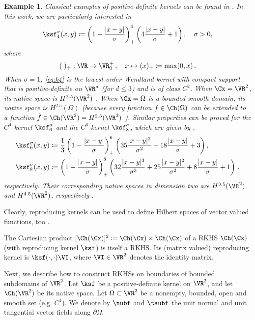 \documentclass{siamart1116}
\newtheorem{example}[theorem]{Example}
\numberwithin{theorem}{section}
\begin{document}
\begin{example}\label{ex:kernel} Classical examples of positive-definite kernels
can be found in \cite{Wendlandbook}. In this work, we are particularly interested in
\begin{equation}\label{eq:k4}
\ksf^\sigma_4(x,y)\coloneqq \left(1-\frac{|x-y|}{\sigma}\right)_+^4\left(4\frac{|x-y|}{\sigma} +1\right), \quad \sigma>0,
\end{equation}
where
\begin{equation*}(\cdot)_+:\VR\to\VR^+_0\,,\quad x\mapsto (x)_+\coloneqq\max(0, x)\,.\end{equation*}
When $\sigma=1$,  \cref{eq:k4} is the lowest order Wendland
kernel with compact support that is
positive-definite on $\VR^d$ (for $d\le 3$) and is of class $C^2$.
When $\Cx=\VR^2$, its native space
is $H^{2.5}(\VR^2)$ \cite[p. 160, Thm. 10.35]{Wendlandbook}. 
When $\Cx=\Omega$ is a bounded smooth domain, its native space is $H^{2.5}(\Omega)$
(because every function $f\in\Ch(\Omega)$ can be extended to a function
$\tilde f\in\Ch(\VR^2) = H^{2.5}(\VR^2)$ \cite[p. 169, Thm. 10.46]{Wendlandbook}).
Similar properties can be proved for the $C^4$-kernel $\ksf^\sigma_6$ and the $C^6$-kernel $\ksf^\sigma_8$,
which are given by \cite{Wendlandbook},
\begin{align}
\label{eq:k6}
\ksf^\sigma_6(x,y)&\coloneqq 
\frac{1}{3}\left(1-\frac{|x-y|}{\sigma}\right)_+^6\left(35\frac{|x-y|^2}{\sigma^2}+18\frac{|x-y|}{\sigma} +3\right), \\
\label{eq:k8}
\ksf^\sigma_8(x,y)&\coloneqq \left(1-\frac{|x-y|}{\sigma}\right)_+^8\left(32\frac{|x-y|^3}{\sigma^3}+25\frac{|x-y|^2}{\sigma^2}
+8\frac{|x-y|}{\sigma} +1\right)\,,
\end{align}
respectively. Their corresponding native spaces in dimension two are $H^{3.5}(\VR^2)$ and 
$H^{4.5}(\VR^2)$, respectively \cite[p. 160, Thm. 10.35]{Wendlandbook}.
\end{example}

Clearly, reproducing kernels can be used to define Hilbert spaces of vector valued functions, too
\cite{Wendlandbook}.
\begin{proposition}
The Cartesian product $[\Ch(\Cx)]^2\coloneqq \Ch(\Cx)\times\Ch(\Cx)$ of a RKHS
$\Ch(\Cx)$ (with reproducing kernel $\ksf$) is itself a RKHS. Its (matrix valued) reproducing kernel is $\ksf(\cdot,\cdot) \VI$, where $\VI\in\VR^2$ denotes the identity matrix.
\end{proposition}

Next, we describe how to construct RKHSs on boundaries of bounded subdomains of $\VR^2$.
Let $\ksf$ be a positive-definite kernel on $\VR^2$, and let $\Ch(\VR^2)$ be 
its native space. Let $\Omega\subset \VR^2$ be a nonempty,
bounded, open and smooth set (e.g. $C^1$). 
We denote by $\nubf$ and $\taubf$ the unit normal and unit tangential vector fields along $\partial \Omega$. 
\end{document}
